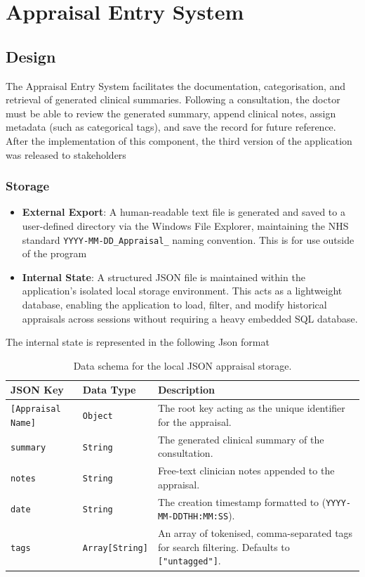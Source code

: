 \section{Appraisal Entry System}
\subsection{Design}
The Appraisal Entry System facilitates the documentation, categorisation, and retrieval of generated clinical summaries. Following a consultation, the doctor must be able to review the generated summary, append clinical notes, assign metadata (such as categorical tags), and save the record for future reference. After the implementation of this component, the third version of the application was released to stakeholders

\subsubsection{Storage}
\begin{itemize}
    \item \textbf{External Export}: A human-readable text file is generated and saved to a user-defined directory via the Windows File Explorer, maintaining the NHS standard \texttt{YYYY-MM-DD\_Appraisal\_} naming convention. This is for use outside of the program
    \item \textbf{Internal State}: A structured JSON file is maintained within the application's isolated local storage environment. This acts as a lightweight database, enabling the application to load, filter, and modify historical appraisals across sessions without requiring a heavy embedded SQL database.
\end{itemize}

The internal state is represented in the following Json format
\begin{table}[H]
\centering
\small
\begin{tabular}{|l|l|p{7cm}|}
\hline
\textbf{JSON Key} & \textbf{Data Type} & \textbf{Description} \\ \hline
\texttt{[Appraisal Name]} & \texttt{Object} & The root key acting as the unique identifier for the appraisal. \\ \hline
\texttt{summary} & \texttt{String} & The generated clinical summary of the consultation. \\ \hline
\texttt{notes} & \texttt{String} & Free-text clinician notes appended to the appraisal. \\ \hline
\texttt{date} & \texttt{String} & The creation timestamp formatted to (\texttt{YYYY-MM-DDTHH:MM:SS}). \\ \hline
\texttt{tags} & \texttt{Array[String]} & An array of tokenised, comma-separated tags for search filtering. Defaults to \texttt{["untagged"]}. \\ \hline
\end{tabular}
\caption{Data schema for the local JSON appraisal storage.}
\label{tab:json_schema}
\end{table}

